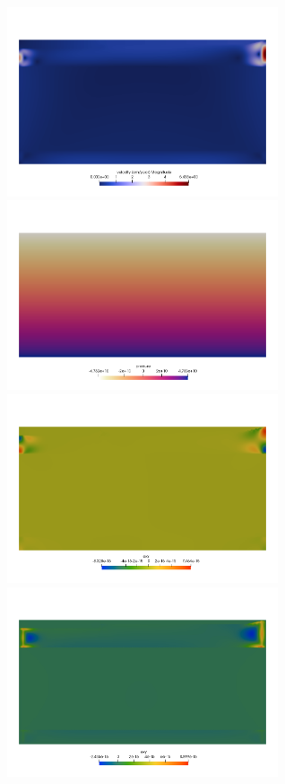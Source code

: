 \begin{center}
\includegraphics[width=8cm]{python_codes/fieldstone_143/results/resolutions/vel}
\includegraphics[width=8cm]{python_codes/fieldstone_143/results/resolutions/press}\\
\includegraphics[width=8cm]{python_codes/fieldstone_143/results/resolutions/exx}
\includegraphics[width=8cm]{python_codes/fieldstone_143/results/resolutions/exy}\\

\end{center}
